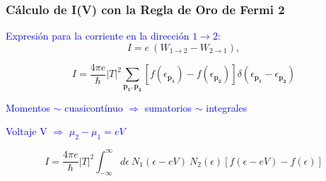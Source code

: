 \begin{frame}
\frametitle{C\'alculo de I(V) con la Regla de Oro de Fermi 2}

\textcolor{blue}{Expresi\'on para la corriente en la direcci\'on $1\to 2$:}
\begin{equation*}\label{current1}
I = e\ (W_{1\to 2} - W_{2\to 1}),
\end{equation*}

\pause
\begin{equation*}\label{current2}
I = \frac{4\pi e}{\hbar} |T|^2 \sum_{\mathbf{p_1},\mathbf{p_2}}  
		[f(\epsilon_{\mathbf{p_1}})-f(\epsilon_{\mathbf{p_2}})] 
		\delta(\epsilon_{\mathbf{p_1}}-\epsilon_{\mathbf{p_2}})
\end{equation*}

\pause
\textcolor{blue}{Momentos $\sim$ cuasicont\'inuo $\Rightarrow$ sumatorios $\sim$ integrales}

\textcolor{blue}{Voltaje V $\Rightarrow$ $\mu_2-\mu_1=eV$}

\begin{equation*}\label{current3}
I = \frac{4\pi e}{\hbar}  |T|^2 \int_{-\infty}^{\infty} d\epsilon\ N_1(\epsilon-eV)\ N_2(\epsilon) [f(\epsilon-eV)-f(\epsilon)]
\end{equation*}


\end{frame}
